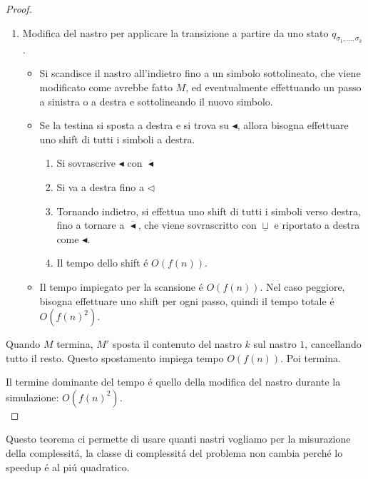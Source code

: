 \begin{proof}
{\begin{enumerate}
\begin{itemize}
			\item Il tempo	 impiegato é $O(f(n))$ (teorema \ref{teorema:spazio_limitato_superiormente_dal_tempo}).
		\end{itemize}
	\item Modifica del nastro per applicare la transizione a partire da uno stato $q_{\sigma_1,\dots,\sigma_k}$.
		\begin{itemize}
			\item Si scandisce il nastro all'indietro fino a un simbolo sottolineato, che viene modificato come avrebbe fatto $M$, ed eventualmente effettuando un passo a sinistra o a destra e sottolineando il nuovo simbolo.
			\item Se la testina si sposta a destra e si trova su $\blacktriangleleft$, allora bisogna effettuare uno shift di tutti i simboli a destra.
				\begin{enumerate}
					\item Si sovrascrive $\blacktriangleleft$ con $\overline{\blacktriangleleft}$
					\item Si va a destra fino a $\triangleleft$
					\item Tornando indietro, si effettua uno shift di tutti i simboli verso destra, fino a tornare a $\overline{\blacktriangleleft}$, che viene sovrascritto con $\underline{\sqcup}$ e riportato a destra come $\blacktriangleleft$.
					\item Il tempo dello shift é $O(f(n))$.
				\end{enumerate}
			\item Il tempo impiegato per la scansione é $O(f(n))$. Nel caso peggiore, bisogna effettuare uno shift per ogni passo, quindi il tempo totale é $O(f(n)^2)$.
		\end{itemize}
\end{enumerate}
}

Quando $M$ termina, $M'$ sposta il contenuto del nastro $k$ sul nastro $1$, cancellando tutto il resto. Questo spostamento impiega tempo $O(f(n))$. Poi termina.

Il termine dominante del tempo é quello della modifica del nastro durante la simulazione: $O(f(n)^2)$. \\
\end{proof}

Questo teorema ci permette di usare quanti nastri vogliamo per la misurazione della complessitá, la classe di complessitá del problema non cambia perché lo speedup é al piú quadratico. \\
